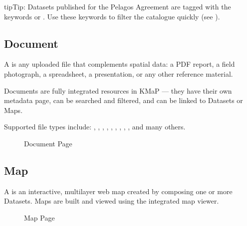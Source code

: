 \documentclass[letterpaper,10pt,english]{sphinxmanual}
\begin{document}
\begin{sphinxadmonition}{tip}{Tip:}
\sphinxAtStartPar
Datasets published for the Pelagos Agreement are tagged with the keywords
 or . Use these keywords to filter
the catalogue quickly (see {\hyperref[\detokenize{02_find_and_visualize:find-en}]{}}).
\end{sphinxadmonition}


\subsection{Document}
\label{\detokenize{01_welcome:document}}
\sphinxAtStartPar
A  is any uploaded file that complements spatial data: a PDF report,
a field photograph, a spreadsheet, a presentation, or any other reference material.

\sphinxAtStartPar
Documents are fully integrated resources in KMaP — they have their own metadata page,
can be searched and filtered, and can be linked to Datasets or Maps.

\sphinxAtStartPar
Supported file types include: , , , , ,
, , , , and many others.

\begin{figure}[htbp]
\centering
\capstart

\noindent{}
\caption{Document Page}\label{\detokenize{01_welcome:id3}}\end{figure}


\subsection{Map}
\label{\detokenize{01_welcome:map}}
\sphinxAtStartPar
A  is an interactive, multi\sphinxhyphen{}layer web map created by composing one or more
Datasets. Maps are built and viewed using the integrated  map viewer.

\begin{figure}[htbp]
\centering
\capstart

\noindent{}
\caption{Map Page}\label{\detokenize{01_welcome:id4}}\end{figure}
\end{document}
